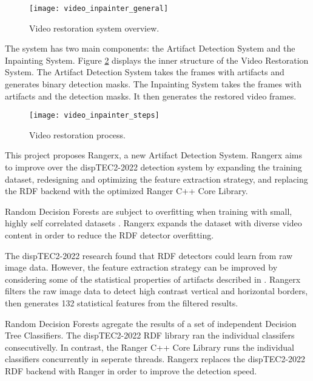 \begin{figure} [!h]
  \centering
  
  \texttt{[image: video\_inpainter\_general]}
  
  \caption{Video restoration system overview.}
  \label{fig:restoration_system_overview}

\end{figure}

The system has two main components: the Artifact Detection System and the Inpainting System. Figure \ref{fig:restoration_system_steps} displays the inner structure of the Video Restoration System. The Artifact Detection System takes the frames with artifacts and generates binary detection masks. The Inpainting System takes the frames with artifacts and the detection masks. It then generates the restored video frames.

\begin{figure} [!h]
  \centering
  
  \texttt{[image: video\_inpainter\_steps]}
  
  \caption{Video restoration process. }
  \label{fig:restoration_system_steps}

\end{figure}

This project proposes Rangerx, a new Artifact Detection System. Rangerx aims to improve over the dispTEC2-2022 detection system by expanding the training dataset, redesigning and optimizing the feature extraction strategy, and replacing the RDF backend with the optimized Ranger C++ Core Library.

Random Decision Forests are subject to overfitting when training with small, highly self correlated datasets \cite{Breiman2001}. Rangerx expands the dataset with diverse video content in order to reduce the RDF detector overfitting.

The dispTEC2-2022 research found that RDF detectors could learn from raw image data. However, the feature extraction strategy can be improved by considering some of the statistical properties of artifacts described in \cite{Vranjes2019, Glavota2018}. Rangerx filters the raw image data to detect high contrast vertical and horizontal borders, then generates 132 statistical features from the filtered results.

Random Decision Forests agregate the results of a set of independent Decision Tree Classifiers. The dispTEC2-2022 RDF library ran the individual classifers consecutivelly. In contrast, the Ranger C++ Core Library runs the individual classifiers concurrently in seperate threads. Rangerx replaces the dispTEC2-2022 RDF backend with Ranger in order to improve the detection speed.

